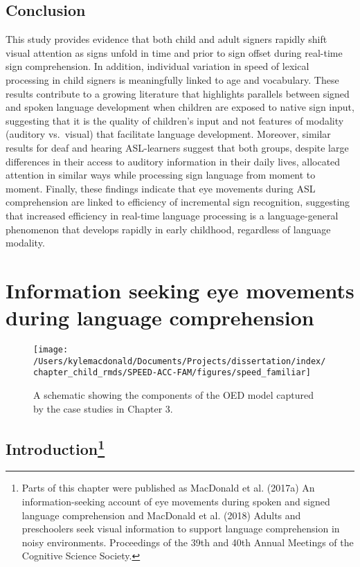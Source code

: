 \documentclass[oneside]{report}
\begin{document}
\section{Conclusion}\label{conclusion}

This study provides evidence that both child and adult signers rapidly
shift visual attention as signs unfold in time and prior to sign offset
during real-time sign comprehension. In addition, individual variation
in speed of lexical processing in child signers is meaningfully linked
to age and vocabulary. These results contribute to a growing literature
that highlights parallels between signed and spoken language development
when children are exposed to native sign input, suggesting that it is
the quality of children's input and not features of modality (auditory
vs.~visual) that facilitate language development. Moreover, similar
results for deaf and hearing ASL-learners suggest that both groups,
despite large differences in their access to auditory information in
their daily lives, allocated attention in similar ways while processing
sign language from moment to moment. Finally, these findings indicate
that eye movements during ASL comprehension are linked to efficiency of
incremental sign recognition, suggesting that increased efficiency in
real-time language processing is a language-general phenomenon that
develops rapidly in early childhood, regardless of language modality.

\chapter{Information seeking eye movements during language
comprehension}\label{speed-fam}
\begin{figure}[t]

{\centering \texttt{[image: /Users/kylemacdonald/Documents/Projects/dissertation/index/chapter\_child\_rmds/SPEED-ACC-FAM/figures/speed\_familiar]} 

}

\caption{A schematic showing the components of the OED model captured by the case studies in Chapter 3.}\label{fig:schematic-speed-fam}
\end{figure}
\section[Introduction]{\texorpdfstring{Introduction\footnote{Parts of
  this chapter were published as MacDonald et al. (2017a) An
  information-seeking account of eye movements during spoken and signed
  language comprehension and MacDonald et al. (2018) Adults and
  preschoolers seek visual information to support language comprehension
  in noisy environments. Proceedings of the 39th and 40th Annual
  Meetings of the Cognitive Science Society.}}{Introduction}}\label{introduction-2}
\end{document}
